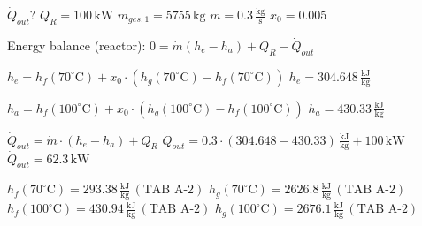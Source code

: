 \( \dot{Q}_{out}? \)  
\( Q_R = 100 \, \text{kW} \)  
\( m_{ges,1} = 5755 \, \text{kg} \)  
\( \dot{m} = 0.3 \, \frac{\text{kg}}{\text{s}} \)  
\( x_0 = 0.005 \)  

Energy balance (reactor):  
\( 0 = \dot{m} (h_e - h_a) + Q_R - \dot{Q}_{out} \)  

\( h_e = h_f(70^\circ \text{C}) + x_0 \cdot (h_g(70^\circ \text{C}) - h_f(70^\circ \text{C})) \)  
\( h_e = 304.648 \, \frac{\text{kJ}}{\text{kg}} \)  

\( h_a = h_f(100^\circ \text{C}) + x_0 \cdot (h_g(100^\circ \text{C}) - h_f(100^\circ \text{C})) \)  
\( h_a = 430.33 \, \frac{\text{kJ}}{\text{kg}} \)  

\( \dot{Q}_{out} = \dot{m} \cdot (h_e - h_a) + Q_R \)  
\( \dot{Q}_{out} = 0.3 \cdot (304.648 - 430.33) \, \frac{\text{kJ}}{\text{kg}} + 100 \, \text{kW} \)  
\( \dot{Q}_{out} = 62.3 \, \text{kW} \)  

\( h_f(70^\circ \text{C}) = 293.38 \, \frac{\text{kJ}}{\text{kg}} \, (\text{TAB A-2}) \)  
\( h_g(70^\circ \text{C}) = 2626.8 \, \frac{\text{kJ}}{\text{kg}} \, (\text{TAB A-2}) \)  
\( h_f(100^\circ \text{C}) = 430.94 \, \frac{\text{kJ}}{\text{kg}} \, (\text{TAB A-2}) \)  
\( h_g(100^\circ \text{C}) = 2676.1 \, \frac{\text{kJ}}{\text{kg}} \, (\text{TAB A-2}) \)